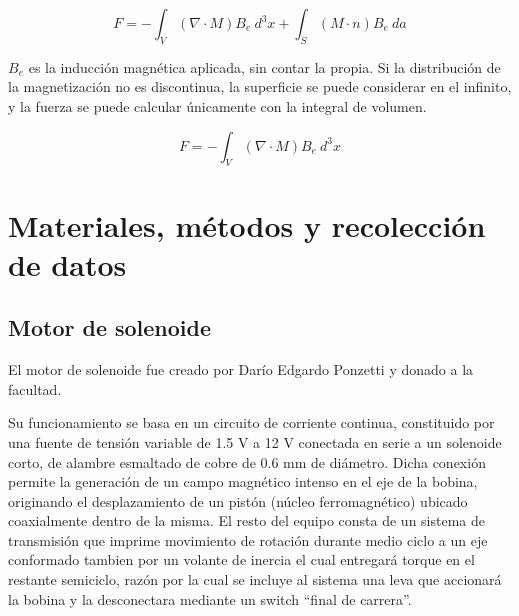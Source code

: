 \documentclass[a4paper,12pt]{article}
\begin{document}
        \begin{equation}
            \label{eq: fuerzaMagnetica}
            F = - \int_{V}^{} (\nabla \cdot M) B_e \ d^3 x + \int_{S}^{} (M \cdot n) B_e \ da
        \end{equation}

        $B_e$ es la inducción magnética aplicada, sin contar la propia. Si la distribución de la magnetización no es discontinua, la superficie se puede considerar en el infinito, y la fuerza se puede calcular únicamente con la integral de volumen.

        \begin{equation}
            \label{eq: fuerzaMagneticaReducida}
            F = - \int_{V}^{} (\nabla \cdot M) B_e \ d^3 x
        \end{equation}

\section*{Materiales, métodos y recolección de datos}

    \subsection*{Motor de solenoide}

        El motor de solenoide fue creado por Darío Edgardo Ponzetti y donado a la facultad.

        Su funcionamiento se basa en un circuito de corriente continua, constituido por una fuente de tensión variable de 1.5 V a 12 V conectada en serie a un solenoide corto, de alambre esmaltado de cobre de 0.6 mm de diámetro. Dicha conexión permite la generación de un campo magnético intenso en el eje de la bobina, originando el desplazamiento de un pistón (núcleo ferromagnético) ubicado coaxialmente dentro de la misma. El resto del equipo consta de un sistema de transmisión que imprime movimiento de rotación durante medio ciclo a un eje conformado tambien por un volante de inercia el cual entregará torque en el restante semiciclo, razón por la cual se incluye al sistema una leva que accionará la bobina y la desconectara mediante un switch “final de carrera”.
\end{document}
